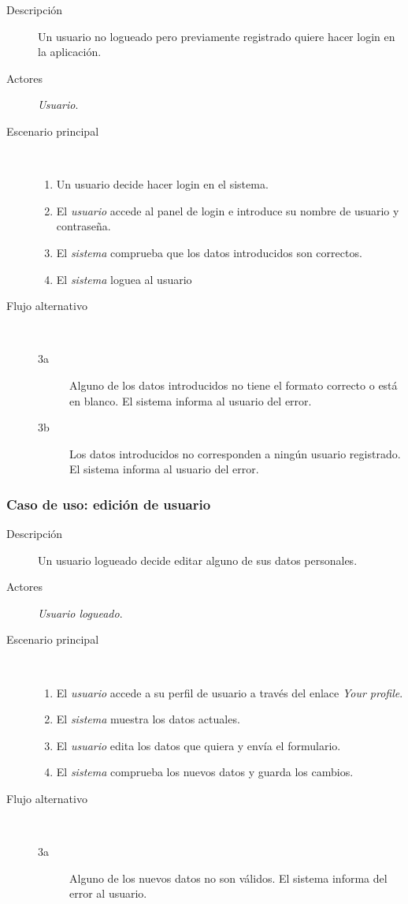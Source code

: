 \begin{description}
\item[Descripción] Un usuario no logueado pero previamente registrado quiere hacer login en la aplicación.
\item[Actores] \textit{Usuario}.
\item[Escenario principal] $\quad$
  \begin{enumerate}
  \item Un usuario decide hacer login en el sistema.
  \item El \textit{usuario} accede al panel de login e introduce su nombre de usuario y contraseña.
  \item El \textit{sistema} comprueba que los datos introducidos son correctos.
  \item El \textit{sistema} loguea al usuario
  \end{enumerate}
\item[Flujo alternativo] $\quad$
  \begin{description}
  \item[3a] Alguno de los datos introducidos no tiene el formato correcto o está
    en blanco. El sistema informa al usuario del error.
  \item[3b] Los datos introducidos no corresponden a ningún usuario
    registrado. El sistema informa al usuario del error.
  \end{description}
\end{description}

\subsubsection{Caso de uso: edición de usuario}

\begin{description}
\item[Descripción] Un usuario logueado decide editar alguno de sus datos personales.
\item[Actores] \textit{Usuario logueado}.
\item[Escenario principal] $\quad$
  \begin{enumerate}
  \item El \textit{usuario} accede a su perfil de usuario a través del enlace \textit{Your profile}.
  \item El \textit{sistema} muestra los datos actuales.
  \item El \textit{usuario} edita los datos que quiera y envía el formulario.
  \item El \textit{sistema} comprueba los nuevos datos y guarda los cambios.
  \end{enumerate}
\item[Flujo alternativo] $\quad$
  \begin{description}
  \item[3a] Alguno de los nuevos datos no son válidos. El sistema informa del error al usuario.
  \end{description}
\end{description}

